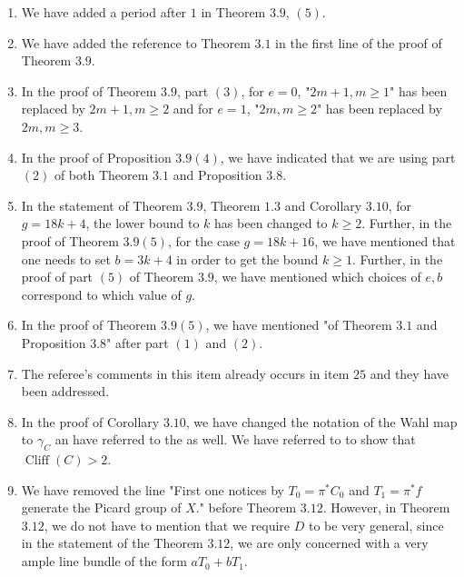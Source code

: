 \documentclass[11pt,twoside]{amsart}
\theoremstyle{plain}
\numberwithin{equation}{section}
\theoremstyle{definition}
\begin{document}
\begin{enumerate}
\item[$(21)$] We have added a period after $1$ in Theorem $3.9$, $(5)$.

\item[$(22)$] We have added the reference to Theorem $3.1$ in the first line of the proof of Theorem $3.9$. 

\item[$(23)$] In the proof of Theorem $3.9$, part $(3)$, for $e = 0$, "$2m+1, m \geq 1$" has been replaced by $2m+1, m \geq 2$ and for $e = 1$, "$2m, m \geq 2$" has been replaced by $2m, m \geq 3$.

\item[$(24)$] In the proof of Proposition $3.9 (4)$, we have indicated that we are using part $(2)$ of both Theorem $3.1$ and Proposition $3.8$.   

\item[$(25)$] In the statement of Theorem $3.9$, Theorem $1.3$ and Corollary $3.10$, for $g = 18k+4$, the lower bound to $k$ has been changed to $k \geq 2$. Further, in the proof of Theorem $3.9 (5)$, for the case $g = 18k+16$, we have mentioned that one needs to set $b = 3k+4$ in order to get the bound $k \geq 1$. Further, in the proof of part $(5)$ of Theorem $3.9$, we have mentioned which choices of $e, b$ correspond to which value of $g$. 

\item[$(26)$] In the proof of Theorem $3.9(5)$, we have mentioned "of Theorem $3.1$ and Proposition $3.8$" after part $(1)$ and $(2)$.  

\item[$(27)$] The referee's comments in this item already occurs in item $25$ and they have been addressed. 

\item[$(28)$] In the proof of Corollary $3.10$, we have changed the notation of the Wahl map to $\gamma_C$ an have referred to the \cite[$2.2.1$]{CDS20} as well. We have referred to \cite[Lemma $8.3$]{K01} to show that $\operatorname{Cliff}(C) > 2$. 

\item[$(29)$] We have removed the line "First one notices by $T_0 = \pi^*C_0$ and $T_1 = \pi^*f$ generate the Picard group of $X$." before Theorem $3.12$. However, in Theorem $3.12$, we do not have to mention that we require $D$ to be very general, since in the statement of the Theorem $3.12$, we are only concerned with a very ample line bundle of the form $aT_0+bT_1$.


\end{enumerate}
\end{document}
